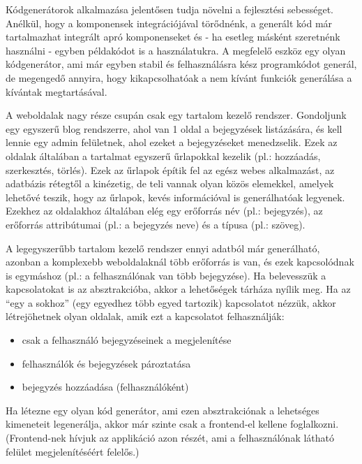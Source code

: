 \documentclass[a4paper,12pt,oneside]{report}
\begin{document}
\begin{justify}

	Kódgenerátorok alkalmazása jelentősen tudja növelni a fejlesztési sebességet. Anélkül, hogy a komponensek integrációjával törődnénk, a generált kód már tartalmazhat integrált apró komponenseket és - ha esetleg másként szeretnénk használni - egyben példakódot is a használatukra. A megfelelő eszköz egy olyan kódgenerátor, ami már egyben stabil és felhasználásra kész programkódot generál, de megengedő annyira, hogy kikapcsolhatóak a nem kívánt funkciók generálása a kívántak megtartásával.

    A weboldalak nagy része csupán csak egy tartalom kezelő rendszer. Gondoljunk egy egyszerű blog rendszerre, ahol van 1 oldal a bejegyzések listázására, és kell lennie egy admin felületnek, ahol ezeket a bejegyzéseket menedzselik. Ezek az oldalak általában a tartalmat egyszerű űrlapokkal kezelik (pl.: hozzáadás, szerkesztés, törlés). Ezek az űrlapok építik fel az egész webes alkalmazást, az adatbázis rétegtől a kinézetig, de teli vannak olyan közös elemekkel, amelyek lehetővé teszik, hogy az űrlapok, kevés információval is generálhatóak legyenek. Ezekhez az oldalakhoz általában elég egy erőforrás név (pl.: bejegyzés), az erőforrás attribútumai (pl.: a bejegyzés neve) és a típusa (pl.: szöveg). 
    
    \label{sec:abstraction_level}
	A legegyszerűbb tartalom kezelő rendszer ennyi adatból már generálható, azonban a komplexebb weboldalaknál több erőforrás is van, és ezek kapcsolódnak is egymáshoz (pl.: a felhasználónak van több bejegyzése). Ha belevesszük a kapcsolatokat is az absztrakcióba, akkor a lehetőségek tárháza nyílik meg. Ha az “egy a sokhoz” (egy egyedhez több egyed tartozik) kapcsolatot nézzük, akkor létrejöhetnek olyan oldalak, amik ezt a kapcsolatot felhasználják:

	\begin{itemize}
		\item csak a felhasználó bejegyzéseinek a megjelenítése
		\item felhasználók és bejegyzések pároztatása
		\item bejegyzés hozzáadása (felhasználóként)
	\end{itemize}

	Ha létezne egy olyan kód generátor, ami ezen absztrakciónak a lehetséges kimeneteit legenerálja, akkor már szinte csak a frontend-el kellene foglalkozni. (Frontend-nek hívjuk az applikáció azon részét, ami a felhasználónak látható felület megjelenítéséért felelős.) 


\end{justify}
\end{document}
